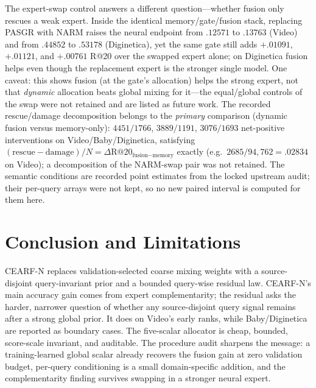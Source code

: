 \documentclass[runningheads]{llncs}
\newcommand{\method}{CEARF-N}
\begin{document}
The expert-swap control answers a different question---whether fusion only
rescues a weak expert. Inside the identical memory/gate/fusion stack,
replacing PASGR with NARM raises the neural endpoint from $.12571$ to
$.13763$ (Video) and from $.44852$ to $.53178$ (Diginetica), yet the same
gate still adds $+.01091$, $+.01121$, and $+.00761$ R@20 over the swapped
expert alone; on Diginetica fusion helps even though the replacement expert
is the stronger single model. One caveat: this shows fusion (at the gate's
allocation) helps the strong expert, not that \emph{dynamic} allocation
beats global mixing for it---the equal/global controls of the swap were not
retained and are listed as future work. The recorded rescue/damage
decomposition belongs to the \emph{primary} comparison (dynamic fusion
versus memory-only): $4451/1766$, $3889/1191$, $3076/1693$ net-positive
interventions on Video/Baby/Diginetica, satisfying
$(\text{rescue}-\text{damage})/N=\Delta\text{R@20}_{\text{fusion}-\text{memory}}$
exactly (e.g.\ $2685/94{,}762=.02834$ on Video); a decomposition of the
NARM-swap pair was not retained. The semantic conditions are recorded point
estimates from the locked upstream audit; their per-query arrays were not
kept, so no new paired interval is computed for them here.


\section{Conclusion and Limitations}
\method{} replaces validation-selected coarse mixing weights with a
source-disjoint query-invariant prior and a bounded query-wise residual law.
CEARF-N's main accuracy gain comes from expert complementarity; the residual
asks the harder, narrower question of whether any source-disjoint query signal
remains after a strong global prior. It does on Video's early ranks, while
Baby/Diginetica are reported as boundary cases. The five-scalar allocator is
cheap, bounded, score-scale invariant, and auditable. The procedure audit
sharpens the message: a training-learned global scalar already recovers the
fusion gain at zero validation budget, per-query conditioning is a small
domain-specific addition, and the complementarity finding survives swapping
in a stronger neural expert.
\end{document}
